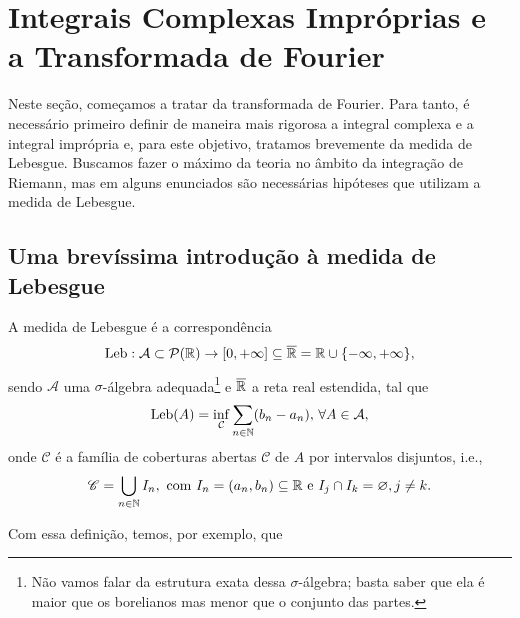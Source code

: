 \section{Integrais Complexas Impróprias e a Transformada de Fourier}
\label{sec:integrais-e-transf-fourier}

    Neste seção, começamos a tratar da transformada de Fourier. Para tanto, é necessário
    primeiro definir de maneira mais rigorosa a integral complexa e a integral imprópria e,
    para este objetivo, tratamos brevemente da medida de Lebesgue. Buscamos fazer o máximo da
    teoria no âmbito da integração de Riemann, mas em alguns enunciados são necessárias hipóteses
    que utilizam a medida de Lebesgue.
    
    \subsection{Uma brevíssima introdução à medida de Lebesgue}
        \begin{definicao}
        \label{def-medida-lebesgue}
            A medida de Lebesgue é a correspondência
            \begin{equation*}
                \mathrm{Leb}: \mathcal{A}\subset\mathcal{P}(\mathbb{R}) \to [0, +\infty] \subseteq\overline{\mathbb{R}} 
                = \mathbb{R}\cup\{-\infty, +\infty\},
            \end{equation*}
            sendo $\mathcal{A}$ uma $\sigma$-álgebra adequada\footnote{Não vamos falar da
            estrutura exata dessa $\sigma$-álgebra; basta saber que ela é maior que os borelianos
            mas menor que o conjunto das partes.} e $\overline{\mathbb{R}}$ a reta real estendida, tal que
            \begin{equation*}
                \mathrm{Leb}(A) = \inf_{\mathcal{C}} \sum_{n\in\mathbb{N}} (b_n - a_n), \, \forall A\in\mathcal{A},
            \end{equation*}
            onde $\mathcal{C}$ é a família de coberturas abertas $\mathscr{C}$ de $A$ por intervalos
            disjuntos, i.e.,
            \begin{equation*}
                \mathscr{C} = \bigcup_{n\in\mathbb{N}} I_n, \text{ com } I_n = (a_n, b_n)\subseteq\mathbb{R}
                \text{ e } I_j\cap I_k = \varnothing, j\neq k.
            \end{equation*}
        \end{definicao}
        Com essa definição, temos, por exemplo, que
